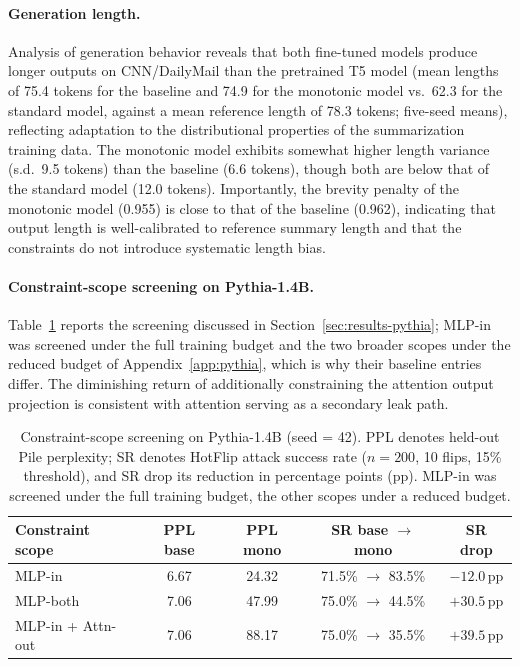 \documentclass{article}
\theoremstyle{plain}
\theoremstyle{definition}
\theoremstyle{remark}
\theoremstyle{plain}
\begin{document}
\paragraph{Generation length.} Analysis of generation behavior reveals that both fine-tuned models produce longer outputs on CNN/DailyMail than the pretrained T5 model (mean lengths of 75.4 tokens for the baseline and 74.9 for the monotonic model vs.\ 62.3 for the standard model, against a mean reference length of 78.3 tokens; five-seed means), reflecting adaptation to the distributional properties of the summarization training data. The monotonic model exhibits somewhat higher length variance (s.d.\ 9.5 tokens) than the baseline (6.6 tokens), though both are below that of the standard model (12.0 tokens). Importantly, the brevity penalty of the monotonic model (0.955) is close to that of the baseline (0.962), indicating that output length is well-calibrated to reference summary length and that the constraints do not introduce systematic length bias.


\paragraph{Constraint-scope screening on Pythia-1.4B.} Table~\ref{tab:pythia-variants} reports the screening discussed in Section~\ref{sec:results-pythia}; MLP-in was screened under the full training budget and the two broader scopes under the reduced budget of Appendix~\ref{app:pythia}, which is why their baseline entries differ. The diminishing return of additionally constraining the attention output projection is consistent with attention serving as a secondary leak path.
\begin{table}[t]
\caption{Constraint-scope screening on Pythia-1.4B (seed = 42). PPL denotes held-out Pile perplexity; SR denotes HotFlip attack success rate ($n = 200$, 10 flips, 15\% threshold), and SR drop its reduction in percentage points (pp). MLP-in was screened under the full training budget, the other scopes under a reduced budget.}
\label{tab:pythia-variants}
\vskip 0.1in
\centering\footnotesize
\begin{tabular}{lcccc}
\toprule
Constraint scope & PPL base & PPL mono & SR base $\to$ mono & SR drop \\
\midrule
MLP-in            & 6.67 & 24.32 & 71.5\% $\to$ 83.5\% & $-12.0$\,pp \\
MLP-both          & 7.06 & 47.99 & 75.0\% $\to$ 44.5\% & $+30.5$\,pp \\
MLP-in + Attn-out & 7.06 & 88.17 & 75.0\% $\to$ 35.5\% & $+39.5$\,pp \\
\bottomrule
\end{tabular}
\vskip -0.1in
\end{table}
\end{document}
